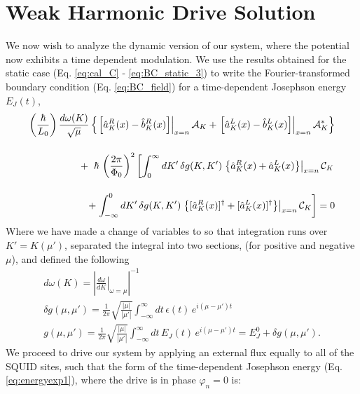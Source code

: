\section{Weak Harmonic Drive Solution}\label{eq:Static_Flux}

We now wish to analyze the dynamic version of our system, where the potential now exhibits a time dependent modulation. We use the results obtained for the static case (Eq. \ref{eq:cal_C} - \ref{eq:BC_static_3}) to write the Fourier-transformed boundary condition (Eq. \ref{eq:BC_field}) for a time-dependent Josephson energy $E_J(t)$,
%
\begin{equation}\label{eq:BC_time_dependent}
\begin{split}
    \left(\frac{\hbar}{L_0}\right)
    \frac{d\omega(K)}{\sqrt{\mu}}
    \left\lbrace
    \left.
    \left[\hat{a}^R_K(x) - \hat{b}_K^R(x)\right]
    \right|_{x=n}
    \mathcal{A}_K +
    \left.
    \left[\hat{a}^L_K(x) - \hat{b}^L_K(x)\right]
    \right|_{x=n}
    \mathcal{A}^*_K
    \right\rbrace
    \\[4mm]
    +\hspace{2mm}
    \hbar \, \left(\frac{2\pi}{\Phi_0}\right)^2
    \left[
    \int_{0}^{\infty} dK'\,
    \delta g(K, K')
    \left.
    \left\lbrace \hat{a}^R_K(x) + \hat{a}_K^L(x) \right\rbrace
    \right|_{x=n}
    \mathcal{C}_K\right.
    \\[4mm]
    +
    \left.
    \int_{-\infty}^{0} dK'\,
    \delta g(K, K')
    \left.
    \left\lbrace [\hat{a}^R_K(x)]^\dagger + [\hat{a}_K^L(x)]^\dagger \right\rbrace
    \right|_{x=n}
    \mathcal{C}_K
    \right]
    = 0
\end{split}
\end{equation}
%
Where we have made a change of variables to so that integration runs over $K'=K(\mu')$, separated the integral into two sections, (for positive and negative $\mu$), and defined the following
%
\begin{gather}
    d\omega (K) = 
    \left|\left.\frac{d\omega}{dK}\right|_{\omega=\mu}\right|^{-1}
    \label{eq:shorthand_dw}
    \\
    \delta g(\mu, \mu') = \frac{1}{2 \pi} \sqrt{\frac{|\mu|}{|\mu'|}}
    \int_{-\infty}^{\infty} dt \, \epsilon(t) \, e^{i(\mu - \mu')t}
    \label{eq:energy_FT}
    \\
    g(\mu, \mu') =  \frac{1}{2 \pi} \sqrt{\frac{|\mu|}{|\mu'|}}
    \int_{-\infty}^{\infty} dt \, E_J(t) \, e^{i(\mu - \mu')t}
    = E_J^0 + \delta g(\mu, \mu').
\end{gather}
%
We proceed to drive our system by applying an external flux equally to all of the SQUID sites, such that the form of the time-dependent Josephson energy (Eq. \ref{eq:energyexp1}), where the drive is in phase $\varphi_n=0$ is:
